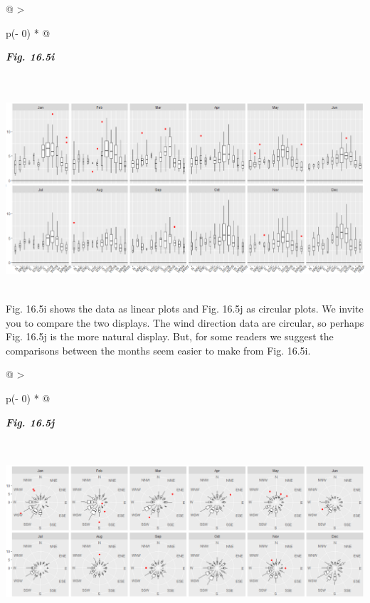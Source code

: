 \documentclass[
  letterpaper,
  DIV=11,
  numbers=noendperiod]{scrreprt}
\begin{document}
\begin{longtable}[]{@{}
  >{\raggedright\arraybackslash}p{(\columnwidth - 0\tabcolsep) * }@{}}
\toprule\noalign{}
\begin{minipage}[b]{\linewidth}\raggedright
\textbf{\emph{Fig. 16.5i}}
\end{minipage} \\
\midrule\noalign{}
\endhead
\bottomrule\noalign{}
\endlastfoot
\includegraphics[width=6.15588in,height=2.93744in]{figures/Fig16.5i.png} \\
\end{longtable}

Fig. 16.5i shows the data as linear plots and Fig. 16.5j as circular
plots. We invite you to compare the two displays. The wind direction
data are circular, so perhaps Fig. 16.5j is the more natural display.
But, for some readers we suggest the comparisons between the months seem
easier to make from Fig. 16.5i.

\begin{longtable}[]{@{}
  >{\raggedright\arraybackslash}p{(\columnwidth - 0\tabcolsep) * }@{}}
\toprule\noalign{}
\begin{minipage}[b]{\linewidth}\raggedright
\textbf{\emph{Fig. 16.5j}}
\end{minipage} \\
\midrule\noalign{}
\endhead
\bottomrule\noalign{}
\endlastfoot
\includegraphics[width=6.13792in,height=2.27129in]{figures/Fig16.5j.png} \\
\end{longtable}
\end{document}
